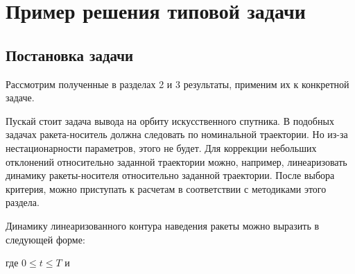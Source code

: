 \chapter{Пример решения типовой задачи}
\renewcommand{\optU}{  \optimum{\m{u}}  } %
\renewcommand{\funcF}{ \calf{F}         } %

\renewcommand{\optF}{  \optimum{\funcF} } %
\newcommand{\funcS}{   \calf{S}         } %



\section{Постановка задачи}



Рассмотрим полученные в разделах 2 и 3 результаты, применим их к конкретной задаче.

Пускай стоит задача вывода на орбиту искусственного спутника. В подобных задачах ракета-носитель должна следовать по номинальной траектории. Но из-за нестационарности параметров, этого не будет. Для коррекции небольших отклонений относительно заданной траектории можно, например, линеаризовать динамику ракеты-носителя относительно заданной траектории. После выбора критерия, можно приступать к расчетам в соответствии с методиками этого раздела.

Динамику линеаризованного контура наведения ракеты можно выразить в следующей форме:

\eeq

где $0 \leqslant t \leqslant T$ и

